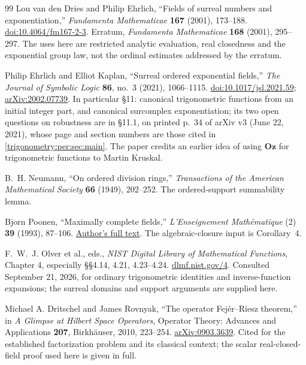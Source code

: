 \documentclass[11pt,letterpaper]{article}
\numberwithin{equation}{section}
\theoremstyle{definition}
\theoremstyle{remark}
\newcommand{\Oz}{\mathbf{Oz}}
\begin{document}
\begin{thebibliography}{99}
Lou van den Dries and Philip Ehrlich, ``Fields of surreal numbers and exponentiation,''
\emph{Fundamenta Mathematicae} \textbf{167} (2001), 173--188.
\href{https://doi.org/10.4064/fm167-2-3}{doi:10.4064/fm167-2-3}.
Erratum, \emph{Fundamenta Mathematicae} \textbf{168} (2001), 295--297.
The uses here are restricted analytic evaluation, real closedness and the exponential group law,
not the ordinal estimates addressed by the erratum.

Philip Ehrlich and Elliot Kaplan, ``Surreal ordered exponential fields,''
\emph{The Journal of Symbolic Logic} \textbf{86}, no.~3 (2021), 1066--1115.
\href{https://doi.org/10.1017/jsl.2021.59}{doi:10.1017/jsl.2021.59};
\href{https://arxiv.org/abs/2002.07739}{arXiv:2002.07739}.
In particular \S11: canonical trigonometric functions from an initial integer part, and canonical
surcomplex exponentiation; its two open questions on robustness are in \S11.1, on printed p.~34 of
arXiv v3 (June 22, 2021), whose page and section numbers are those cited in
\cref{trigonometry:per:sec:main}. The paper credits an earlier idea of using $\Oz$ for trigonometric
functions to Martin Kruskal.

B.~H. Neumann, ``On ordered division rings,''
\emph{Transactions of the American Mathematical Society} \textbf{66} (1949), 202--252.
The ordered-support summability lemma.

Bjorn Poonen, ``Maximally complete fields,''
\emph{L'Enseignement Math\'ematique} (2) \textbf{39} (1993), 87--106.
\href{https://math.mit.edu/~poonen/papers/amsval.pdf}{Author's full text}.
The algebraic-closure input is Corollary~4.

F.~W.~J. Olver et al., eds., \emph{NIST Digital Library of Mathematical Functions}, Chapter 4,
especially \S\S4.14, 4.21, 4.23--4.24. \href{https://dlmf.nist.gov/4}{dlmf.nist.gov/4}.
Consulted September 21, 2026, for ordinary trigonometric identities and inverse-function
expansions; the surreal domains and support arguments are supplied here.

Michael A. Dritschel and James Rovnyak, ``The operator Fej\'er--Riesz theorem,'' in
\emph{A Glimpse at Hilbert Space Operators}, Operator Theory: Advances and Applications
\textbf{207}, Birkh\"auser, 2010, 223--254.
\href{https://arxiv.org/abs/0903.3639}{arXiv:0903.3639}.
Cited for the established factorization problem and its classical context; the scalar
real-closed-field proof used here is given in full.


\end{thebibliography}
\end{document}

